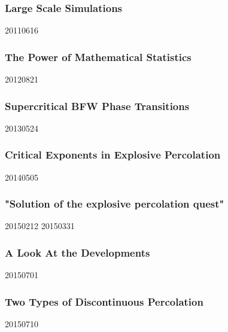 \subsubsection{Large Scale Simulations}
20110616
\cite{Lee_1}



\subsubsection{The Power of Mathematical Statistics}
20120821
\cite{Riordan_1}



\subsubsection{Supercritical BFW Phase Transitions}
20130524
\cite{Chen_3}



\subsubsection{Critical Exponents in Explosive Percolation}
20140505
\cite{da_Costa_5}



\subsubsection{"Solution of the explosive percolation quest"}
20150212
\cite{da_Costa_2}
20150331
\cite{da_Costa_3}



\subsubsection{A Look At the Developments}
20150701
\cite{D_Souza_2}


\subsubsection{Two Types of Discontinuous Percolation}
20150710
\cite{Cho_6}
